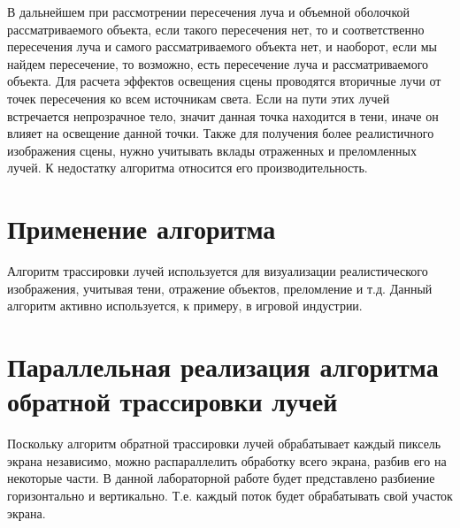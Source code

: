 \begin{figure}[ht!]
\end{figure}

В дальнейшем при рассмотрении пересечения луча и объемной оболочкой
рассматриваемого объекта, если такого пересечения нет, то и соответственно пере­сечения
луча и самого рассматриваемого объекта нет, и наоборот, если мы найдем
пересечение, то возможно, есть пересечение луча и рассматриваемого объекта. Для
расчета эффектов освещения сцены проводятся вторичные лучи от точек пересече­ния
ко всем источникам света. Если на пути этих лучей встречается непрозрачное
тело, значит данная точка находится в тени, иначе он влияет на освещение данной
точки. Также для получения более реалистичного изображения сцены, нужно учи­тывать
вклады отраженных и преломленных лучей.
К недостатку алгоритма относится его производительность.

\section{Применение алгоритма}

Алгоритм трассировки лучей используется для визуализации
реалистического изображения, учитывая тени, отражение объектов, преломление и т.д.
Данный алгоритм активно используется, к примеру, в игровой индустрии.

\section{Параллельная реализация алгоритма обратной трассировки лучей}

Поскольку алгоритм обратной трассировки лучей обрабатывает каждый пиксель
экрана независимо, можно распараллелить обработку всего экрана, разбив
его на некоторые части. В данной лабораторной работе будет представлено 
разбиение горизонтально и вертикально. Т.е. каждый поток будет обрабатывать
свой участок экрана. 


